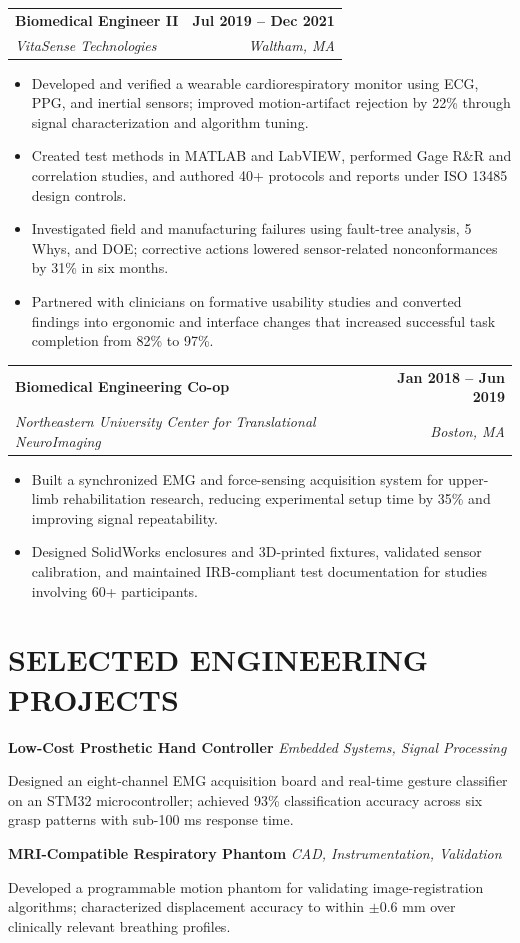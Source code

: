 \documentclass[10pt,letterpaper]{article}
\makeatletter
\newcommand{\role}[4]{%
  \begin{tabularx}{\textwidth}{@{}Xr@{}}
    \textbf{\color{charcoal}#1} & \textbf{\color{charcoal}#2} \\
    \textit{\color{muted}#3} & \textit{\color{muted}#4}
  \end{tabularx}\vspace{-0.25em}
}
\newcommand{\project}[2]{%
  \textbf{\color{charcoal}#1} \hfill \textit{\color{muted}#2}\par
}
\makeatother
\begin{document}
\role{Biomedical Engineer II}{Jul 2019 -- Dec 2021}{VitaSense Technologies}{Waltham, MA}
\begin{itemize}
  \item Developed and verified a wearable cardiorespiratory monitor using ECG, PPG, and inertial sensors; improved motion-artifact rejection by 22\% through signal characterization and algorithm tuning.
  \item Created test methods in MATLAB and LabVIEW, performed Gage R\&R and correlation studies, and authored 40+ protocols and reports under ISO 13485 design controls.
  \item Investigated field and manufacturing failures using fault-tree analysis, 5 Whys, and DOE; corrective actions lowered sensor-related nonconformances by 31\% in six months.
  \item Partnered with clinicians on formative usability studies and converted findings into ergonomic and interface changes that increased successful task completion from 82\% to 97\%.
\end{itemize}

\role{Biomedical Engineering Co-op}{Jan 2018 -- Jun 2019}{Northeastern University Center for Translational NeuroImaging}{Boston, MA}
\begin{itemize}
  \item Built a synchronized EMG and force-sensing acquisition system for upper-limb rehabilitation research, reducing experimental setup time by 35\% and improving signal repeatability.
  \item Designed SolidWorks enclosures and 3D-printed fixtures, validated sensor calibration, and maintained IRB-compliant test documentation for studies involving 60+ participants.
\end{itemize}

\section*{SELECTED ENGINEERING PROJECTS}

\project{Low-Cost Prosthetic Hand Controller}{Embedded Systems, Signal Processing}
Designed an eight-channel EMG acquisition board and real-time gesture classifier on an STM32 microcontroller; achieved 93\% classification accuracy across six grasp patterns with sub-100 ms response time.

\vspace{2pt}
\project{MRI-Compatible Respiratory Phantom}{CAD, Instrumentation, Validation}
Developed a programmable motion phantom for validating image-registration algorithms; characterized displacement accuracy to within $\pm$0.6 mm over clinically relevant breathing profiles.
\end{document}
